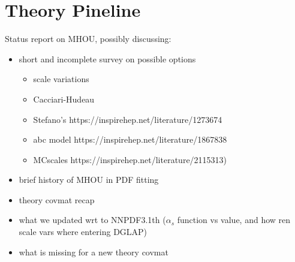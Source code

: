 
\chapter{Theory Pineline}
\label{ch:pine}
\minitoc
\adjustmtc


Status report on MHOU, possibly discussing:
\begin{itemize}
	\item short and incomplete survey on possible options
	\begin{itemize}
		\item scale variations
		\item Cacciari-Hudeau
		\item  Stefano's https://inspirehep.net/literature/1273674
		\item abc model https://inspirehep.net/literature/1867838
		\item MCscales https://inspirehep.net/literature/2115313)
	\end{itemize} 
	\item brief history of MHOU in PDF fitting
	\item theory covmat recap
	\item what we updated wrt to NNPDF3.1th ($\alpha_s$ function vs value, and
		how ren scale vars where entering DGLAP)
	\item what is missing for a new theory covmat
\end{itemize}


